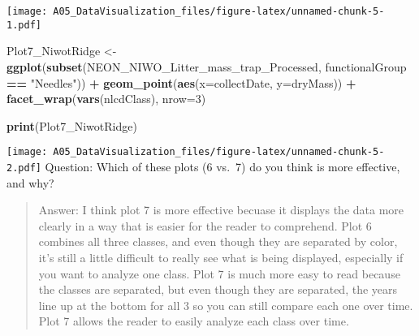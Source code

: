 \documentclass[
]{article}
\newenvironment{Shaded}{\begin{snugshade}}{\end{snugshade}}
\newcommand{\DataTypeTok}[1]{\textcolor[rgb]{0.13,0.29,0.53}{#1}}
\newcommand{\DecValTok}[1]{\textcolor[rgb]{0.00,0.00,0.81}{#1}}
\newcommand{\KeywordTok}[1]{\textcolor[rgb]{0.13,0.29,0.53}{\textbf{#1}}}
\newcommand{\NormalTok}[1]{#1}
\newcommand{\OperatorTok}[1]{\textcolor[rgb]{0.81,0.36,0.00}{\textbf{#1}}}
\newcommand{\StringTok}[1]{\textcolor[rgb]{0.31,0.60,0.02}{#1}}
\begin{document}
\texttt{[image: A05\_DataVisualization\_files/figure-latex/unnamed-chunk-5-1.pdf]}

\begin{Shaded}
\begin{Highlighting}[]
\NormalTok{Plot7_NiwotRidge <-}\StringTok{ }\KeywordTok{ggplot}\NormalTok{(}\KeywordTok{subset}\NormalTok{(NEON_NIWO_Litter_mass_trap_Processed, }
\NormalTok{                                  functionalGroup }\OperatorTok{==}\StringTok{ "Needles"}\NormalTok{)) }\OperatorTok{+}
\StringTok{  }\KeywordTok{geom_point}\NormalTok{(}\KeywordTok{aes}\NormalTok{(}\DataTypeTok{x=}\NormalTok{collectDate, }\DataTypeTok{y=}\NormalTok{dryMass)) }\OperatorTok{+}
\StringTok{  }\KeywordTok{facet_wrap}\NormalTok{(}\KeywordTok{vars}\NormalTok{(nlcdClass), }\DataTypeTok{nrow=}\DecValTok{3}\NormalTok{)}

\KeywordTok{print}\NormalTok{(Plot7_NiwotRidge)}
\end{Highlighting}
\end{Shaded}

\texttt{[image: A05\_DataVisualization\_files/figure-latex/unnamed-chunk-5-2.pdf]}
Question: Which of these plots (6 vs.~7) do you think is more effective,
and why?

\begin{quote}
Answer: I think plot 7 is more effective becuase it displays the data
more clearly in a way that is easier for the reader to comprehend. Plot
6 combines all three classes, and even though they are separated by
color, it's still a little difficult to really see what is being
displayed, especially if you want to analyze one class. Plot 7 is much
more easy to read because the classes are separated, but even though
they are separated, the years line up at the bottom for all 3 so you can
still compare each one over time. Plot 7 allows the reader to easily
analyze each class over time.
\end{quote}
\end{document}
